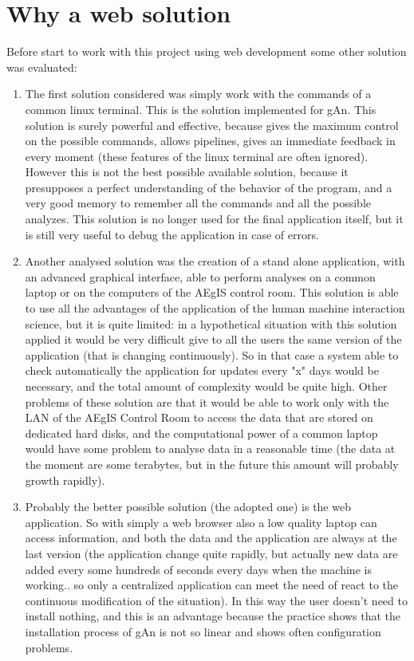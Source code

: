 \section{Why a web solution}

Before start to work with this project using web development some other solution was evaluated:

\begin{enumerate}

\item 
The first solution considered was simply work with the commands of a common linux terminal. This is the solution implemented for gAn. This solution is surely powerful and effective, because gives the maximum control on the possible commands, allows pipelines, gives an immediate feedback in every moment (these features of the linux terminal are often ignored). However this is not the best possible available solution, because it presupposes a perfect understanding of the behavior of the program, and a very good memory to remember all the commands and all the possible analyzes. 
This solution is no longer used for the final application itself, but it is still very useful to debug the application in case of errors.   

\item
Another analysed solution was the creation of a stand alone application, with an advanced graphical interface, able to perform analyses on a common laptop or on the computers of the AEgIS control room. This solution is able to use all the advantages of the application of the human machine interaction science, but it is quite limited: in a hypothetical situation with this solution applied it would be very difficult give to all the users the same version of the application (that is changing continuously). So in that case a system able to check automatically the application for updates every "x" days would be necessary, and the total amount of complexity would be quite high. Other problems of these solution are that it would be able to work only with the LAN of the AEgIS Control Room to access the data that are stored on dedicated hard disks, and the computational power of a common laptop would have some problem to analyse data in a reasonable time (the data at the moment are some terabytes, but in the future this amount will probably growth rapidly).

\item
Probably the better possible solution (the adopted one) is the web application. So with simply a web browser also a low quality laptop can access information, and both the data and the application are always at the last version (the application change quite rapidly, but actually new data are added every some hundreds of seconds every days when the machine is working.. so only a centralized application can meet the need of react to the continuous modification of the situation).
In this way the user doesn't need to install nothing, and this is an advantage because the practice shows that the installation process of gAn is not so linear and shows often configuration problems.

\end{enumerate}
 
